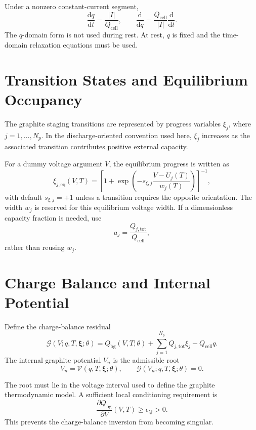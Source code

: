 \documentclass[11pt,a4paper]{article}
\newcommand{\dd}{\mathrm{d}}
\newcommand{\bg}{\mathrm{bg}}
\newcommand{\cell}{\mathrm{cell}}
\newcommand{\tot}{\mathrm{tot}}
\newcommand{\eq}{\mathrm{eq}}
\begin{document}
Under a nonzero constant-current segment,
\begin{equation}
\frac{\dd q}{\dd t}=\frac{|I|}{Q_{\cell}},
\qquad
\frac{\dd}{\dd q}=\frac{Q_{\cell}}{|I|}\frac{\dd}{\dd t}.
\label{eq:q_time_conversion}
\end{equation}
The \(q\)-domain form is not used during rest.  At rest, \(q\) is fixed and the
time-domain relaxation equations must be used.

\section{Transition States and Equilibrium Occupancy}

The graphite staging transitions are represented by progress variables
\(\xi_j\), where \(j=1,\ldots,N_p\).  In the discharge-oriented convention used
here, \(\xi_j\) increases as the associated transition contributes positive
external capacity.

For a dummy voltage argument \(V\), the equilibrium progress is written as
\begin{equation}
\xi_{j,\eq}(V,T)
=
\left[
1+\exp\!\left(
-s_{\xi,j}\frac{V-U_j(T)}{w_j(T)}
\right)
\right]^{-1},
\label{eq:xi_eq_dummy_voltage}
\end{equation}
with default \(s_{\xi,j}=+1\) unless a transition requires the opposite
orientation.  The width \(w_j\) is reserved for this equilibrium voltage width.
If a dimensionless capacity fraction is needed, use
\begin{equation}
a_j=\frac{Q_{j,\tot}}{Q_{\cell}},
\end{equation}
rather than reusing \(w_j\).

\section{Charge Balance and Internal Potential}

Define the charge-balance residual
\begin{equation}
\mathcal G(V;q,T,\bm{\xi};\theta)
=
Q_{\bg}(V,T;\theta)
+\sum_{j=1}^{N_p}Q_{j,\tot}\xi_j
-Q_{\cell}q .
\label{eq:charge_balance_residual}
\end{equation}
The internal graphite potential \(V_n\) is the admissible root
\begin{equation}
V_n=\mathcal V(q,T,\bm{\xi};\theta),
\qquad
\mathcal G(V_n;q,T,\bm{\xi};\theta)=0.
\label{eq:V_root_operator}
\end{equation}

The root must lie in the voltage interval used to define the graphite
thermodynamic model.  A sufficient local conditioning requirement is
\begin{equation}
\frac{\partial Q_{\bg}}{\partial V}(V,T)\ge \epsilon_Q>0.
\label{eq:bg_slope_floor_draft}
\end{equation}
This prevents the charge-balance inversion from becoming singular.
\end{document}

